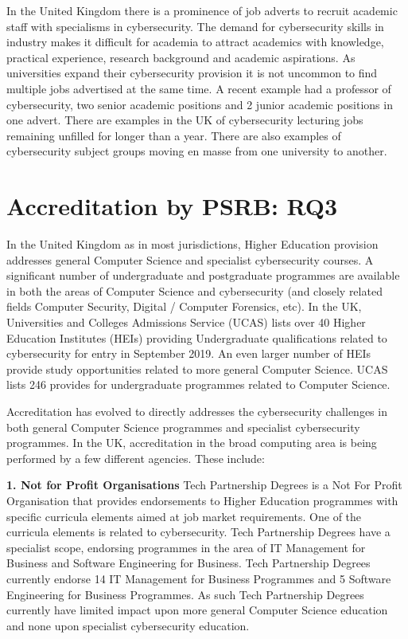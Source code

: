 \documentclass[conference]{IEEEtran}
\begin{document}
In the United Kingdom there is a prominence of job adverts to recruit academic staff with specialisms in cybersecurity. The demand for cybersecurity skills in industry makes it difficult for academia to attract academics with knowledge, practical experience, research background and academic aspirations. As universities expand their cybersecurity provision it is not uncommon to find multiple jobs advertised at the same time.  A recent example had a professor of cybersecurity, two senior academic positions and 2 junior academic positions in one advert. There are examples in the UK of cybersecurity lecturing jobs remaining unfilled for longer than a year. There are also examples of  cybersecurity subject groups moving en masse from one university to another.



\section{Accreditation by PSRB: RQ3}

In the United Kingdom as in most jurisdictions, Higher Education provision addresses general Computer Science  and specialist cybersecurity courses. A significant number of undergraduate and postgraduate programmes are available in both the areas of Computer Science and cybersecurity (and closely related fields Computer Security, Digital / Computer Forensics, etc). In the UK, Universities and Colleges Admissions Service (UCAS) lists over 40 Higher Education Institutes (HEIs) providing Undergraduate qualifications related to cybersecurity for entry in September 2019. An even larger number of HEIs provide study opportunities related to more general Computer Science. UCAS lists 246 provides for undergraduate programmes related to Computer Science. 

Accreditation has evolved to directly addresses the cybersecurity challenges in both general Computer Science programmes and specialist cybersecurity programmes. In the UK, accreditation in the broad computing area is being performed by a few different agencies. These include:

\textbf{1. Not for Profit Organisations}
Tech Partnership Degrees is a Not For Profit Organisation that provides endorsements to Higher Education programmes with specific curricula elements aimed at job market requirements. One of the curricula elements is related to cybersecurity. Tech Partnership Degrees have a specialist scope, endorsing programmes in the area of IT Management for Business and Software Engineering for Business.  Tech Partnership Degrees currently endorse 14 IT Management for Business Programmes and 5 Software Engineering for Business Programmes. As such Tech Partnership Degrees currently have limited impact upon more general Computer Science education and none upon specialist cybersecurity education. 
\end{document}
